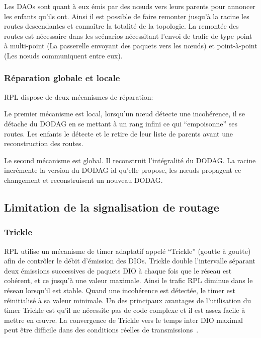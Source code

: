 Les \ac{DAO}s sont quant à eux émis par des nœuds vers leurs parents pour annoncer les enfants qu'ils ont.
Ainsi il est possible de faire remonter jusqu'à la racine les routes descendantes et connaître la totalité de la topologie.
La remontée des routes est nécessaire dans les scénarios nécessitant l'envoi de trafic de type point à multi-point (La passerelle envoyant des paquets vers les nœuds) et point-à-point (Les nœuds communiquent entre eux).

\subsubsection{Réparation globale et locale}

\ac{RPL} dispose de deux mécanismes de réparation:

Le premier mécanisme est local, lorsqu'un nœud détecte une incohérence, il se détache du \ac{DODAG} en se mettant à un rang infini ce qui ``empoisonne'' ses routes.
Les enfants le détecte et le retire de leur liste de parents avant une reconstruction des routes.

Le second mécanisme est global.
Il reconstruit l'intégralité du \ac{DODAG}.
La racine incrémente la version du \ac{DODAG} id qu'elle propose, les nœuds propagent ce changement et reconstruisent un nouveau \ac{DODAG}.

\subsection{Limitation de la signalisation de routage}

\subsubsection{Trickle}

\ac{RPL} utilise un mécanisme de timer adaptatif appelé  ``Trickle'' (goutte à goutte) afin de contrôler le débit d’émission des \ac{DIO}s.
Trickle double l’intervalle séparant deux émissions successives de paquets \ac{DIO} à chaque fois que le réseau est cohérent, et ce jusqu’à une valeur maximale.
Ainsi le trafic \ac{RPL} diminue dans le réseau lorsqu'il est stable.
Quand une incohérence est détectée, le timer est réinitialisé à sa valeur minimale.
Un des principaux avantages de l’utilisation du timer Trickle est qu’il ne nécessite pas de code complexe et il est assez facile à mettre en œuvre.
La convergence de Trickle vers le temps inter \ac{DIO} maximal peut être difficile dans des conditions réelles de transmissions~\cite{tripathi2010performance}.


